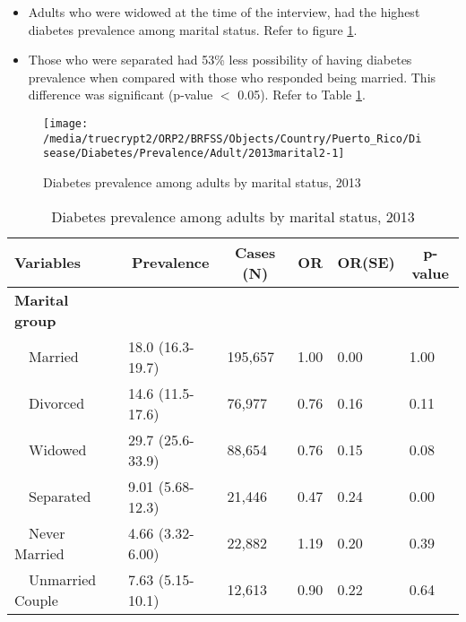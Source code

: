  \newpage
\begin{itemize}

\item Adults who were 
widowed at the time of the interview, had the highest diabetes prevalence among marital status. Refer to figure \ref{fig:marital.Diabetes.2013}.

\item Those who were separated had 53\% less possibility of having diabetes prevalence when compared with those who responded being married. This difference was significant (p-value $<$ 0.05). Refer to Table \ref{tab:marital.Diabetes.2013}.

\end{itemize}

\begin{figure}[H]
\caption{Diabetes prevalence among adults by marital status,
         2013}
\label{fig:marital.Diabetes.2013}
\begin{knitrout}
\color{fgcolor}

{\centering \texttt{[image: /media/truecrypt2/ORP2/BRFSS/Objects/Country/Puerto\_Rico/Disease/Diabetes/Prevalence/Adult/2013marital2-1]} 

}



\end{knitrout}
 \end{figure}

\begin{table}[H]
\caption{Diabetes prevalence  among adults by marital status, 2013\label{tab:marital.Diabetes.2013}} 
\begin{center}
\begin{tabular}{llllll}
\hline\hline
\multicolumn{1}{l}{Variables}&\multicolumn{1}{c}{Prevalence}&\multicolumn{1}{c}{Cases (N)}&\multicolumn{1}{c}{OR}&\multicolumn{1}{c}{OR(SE)}&\multicolumn{1}{c}{p-value}\tabularnewline
\hline
{\bfseries Marital group}&&&&&\tabularnewline
~~Married&18.0 (16.3-19.7)&195,657&1.00&0.00&1.00\tabularnewline
~~Divorced&14.6 (11.5-17.6)& 76,977&0.76&0.16&0.11\tabularnewline
~~Widowed&29.7 (25.6-33.9)& 88,654&0.76&0.15&0.08\tabularnewline
~~Separated&9.01 (5.68-12.3)& 21,446&0.47&0.24&0.00\tabularnewline
~~Never Married&4.66 (3.32-6.00)& 22,882&1.19&0.20&0.39\tabularnewline
~~Unmarried Couple&7.63 (5.15-10.1)& 12,613&0.90&0.22&0.64\tabularnewline
\hline
\end{tabular}\end{center}

\end{table}

